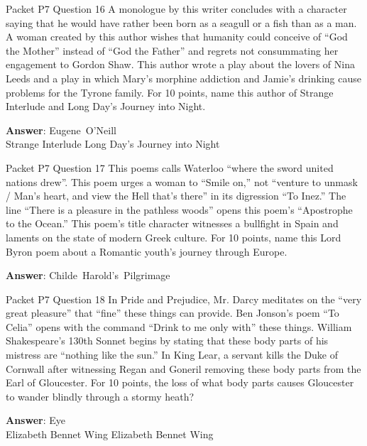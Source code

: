 \begin{frame}{Packet P7 Question 16}
A monologue by this writer concludes with a character saying that he would have rather been born as a seagull or a fish than as a man. A woman created by this author wishes that humanity could conceive of “God the Mother” instead of “God the Father” and regrets not consummating her engagement to Gordon Shaw. This author wrote a play about the lovers of Nina Leeds and a play in which   Mary’s morphine     addiction and Jamie’s   drinking cause problems for the Tyrone family. For 10 points,   name this author of Strange Interlude and Long Day’s Journey   into Night.

\textbf{Answer}: Eugene\ O'Neill\\
 Strange Interlude
 Long Day's Journey into Night
\end{frame}

\begin{frame}{Packet P7 Question 17}
This poems calls Waterloo ``where the sword united nations drew''. This poem urges a woman to “Smile on,”   not “venture to unmask / Man's heart, and view the Hell that's there” in its digression “To Inez.” The line “There is a pleasure in the pathless woods” opens this poem’s “Apostrophe to the Ocean.” This poem’s title character witnesses a bullfight in Spain and   laments on the state of modern Greek culture. For 10 points, name this Lord Byron     poem about a Romantic youth’s journey through Europe.

\textbf{Answer}: Childe\ Harold's\ Pilgrimage\\
\end{frame}

\begin{frame}{Packet P7 Question 18}
In Pride and Prejudice, Mr. Darcy meditates   on the “very great pleasure” that “fine” these things can provide. Ben Jonson’s poem “To Celia” opens with the command “Drink to me only with” these things. William Shakespeare’s 130th Sonnet begins by stating that these body parts of his mistress are “nothing like the sun.” In King Lear, a servant kills the Duke of   Cornwall after witnessing Regan and Goneril removing these body parts from the Earl     of Gloucester. For 10 points, the loss of what body parts causes Gloucester to wander blindly through a stormy heath?    

\textbf{Answer}: Eye\\
 Elizabeth Bennet
 Wing
 Elizabeth Bennet
 Wing
\end{frame}

